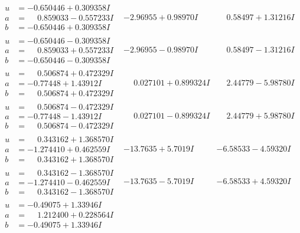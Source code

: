 \documentclass[1p]{elsarticle_modified}
\theoremstyle{definition}
\begin{document}
$$\begin{array}{c|c|c}
\begin{aligned}
u &= -0.650446 + 0.309358 I \\
a &= \phantom{-}0.859033 - 0.557233 I \\
b &= -0.650446 + 0.309358 I\end{aligned}
 & -2.96955 + 0.98970 I & \phantom{-}0.58497 + 1.31216 I \\ \hline\begin{aligned}
u &= -0.650446 - 0.309358 I \\
a &= \phantom{-}0.859033 + 0.557233 I \\
b &= -0.650446 - 0.309358 I\end{aligned}
 & -2.96955 - 0.98970 I & \phantom{-}0.58497 - 1.31216 I \\ \hline\begin{aligned}
u &= \phantom{-}0.506874 + 0.472329 I \\
a &= -0.77448 + 1.43912 I \\
b &= \phantom{-}0.506874 + 0.472329 I\end{aligned}
 & \phantom{-}0.027101 + 0.899324 I & \phantom{-}2.44779 - 5.98780 I \\ \hline\begin{aligned}
u &= \phantom{-}0.506874 - 0.472329 I \\
a &= -0.77448 - 1.43912 I \\
b &= \phantom{-}0.506874 - 0.472329 I\end{aligned}
 & \phantom{-}0.027101 - 0.899324 I & \phantom{-}2.44779 + 5.98780 I \\ \hline\begin{aligned}
u &= \phantom{-}0.343162 + 1.368570 I \\
a &= -1.274410 + 0.462559 I \\
b &= \phantom{-}0.343162 + 1.368570 I\end{aligned}
 & -13.7635 + 5.7019 I & -6.58533 - 4.59320 I \\ \hline\begin{aligned}
u &= \phantom{-}0.343162 - 1.368570 I \\
a &= -1.274410 - 0.462559 I \\
b &= \phantom{-}0.343162 - 1.368570 I\end{aligned}
 & -13.7635 - 5.7019 I & -6.58533 + 4.59320 I \\ \hline\begin{aligned}
u &= -0.49075 + 1.33946 I \\
a &= \phantom{-}1.212400 + 0.228564 I \\
b &= -0.49075 + 1.33946 I\end{aligned}

\end{array}$$
\end{document}
